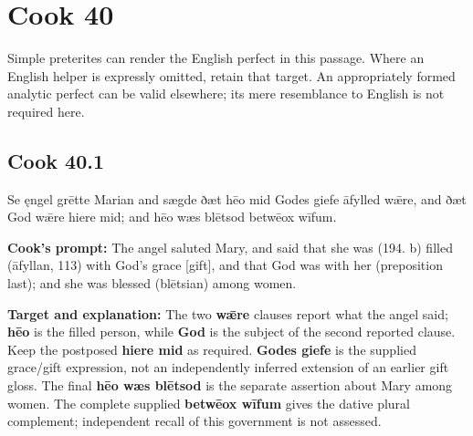 \clearpage
\section*{Cook 40}

Simple preterites can render the English perfect in this passage. Where an English helper is expressly omitted, retain that target. An appropriately formed analytic perfect can be valid elsewhere; its mere resemblance to English is not required here.

\par\begin{minipage}{\linewidth}\raggedright
\subsection*{Cook 40.1}

Se ęngel grētte Marian and sægde ðæt hēo mid Godes giefe āfylled wǣre, and ðæt God wǣre hiere mid; and hēo wæs blētsod betwēox wīfum.

\textbf{Cook's prompt:} The angel saluted Mary, and said that she was (194. b) filled (āfyllan, 113) with God’s grace [gift], and that God was with her (preposition last); and she was blessed (blētsian) among women.

\textbf{Target and explanation:} The two \textbf{wǣre} clauses report what the angel said; \textbf{hēo} is the filled person, while \textbf{God} is the subject of the second reported clause. Keep the postposed \textbf{hiere mid} as required. \textbf{Godes giefe} is the supplied grace/\allowbreak{}gift expression, not an independently inferred extension of an earlier gift gloss. The final \textbf{hēo wæs blētsod} is the separate assertion about Mary among women. The complete supplied \textbf{betwēox wīfum} gives the dative plural complement; independent recall of this government is not assessed.

\end{minipage}\par\addvspace{4pt}

